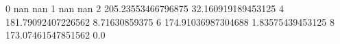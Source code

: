 0 nan nan
1 nan nan
2 205.23553466796875 32.160919189453125
4 181.79092407226562 8.71630859375
6 174.91036987304688 1.83575439453125
8 173.07461547851562 0.0
